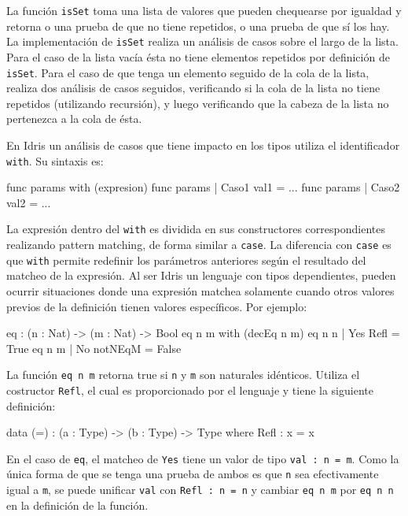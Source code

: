 La función \texttt{isSet} toma una lista de valores que pueden chequearse por igualdad y retorna o una prueba de que no tiene repetidos, o una prueba de que sí los hay. La implementación de \texttt{isSet} realiza un análisis de casos sobre el largo de la lista. Para el caso de la lista vacía ésta no tiene elementos repetidos por definición de \texttt{isSet}. Para el caso de que tenga un elemento seguido de la cola de la lista, realiza dos análisis de casos seguidos, verificando si la cola de la lista no tiene repetidos (utilizando recursión), y luego verificando que la cabeza de la lista no pertenezca a la cola de ésta.

En Idris un análisis de casos que tiene impacto en los tipos utiliza el identificador \texttt{with}. Su sintaxis es:

\begin{code}
func params with (expresion)
  func params | Caso1 val1 = ...
  func params | Caso2 val2 = ...
\end{code}

La expresión dentro del \texttt{with} es dividida en sus constructores correspondientes realizando pattern matching, de forma similar a \texttt{case}. La diferencia con \texttt{case} es que \texttt{with} permite redefinir los parámetros anteriores según el resultado del matcheo de la expresión. Al ser Idris un lenguaje con tipos dependientes, pueden ocurrir situaciones donde una expresión matchea solamente cuando otros valores previos de la definición tienen valores específicos. Por ejemplo:

\begin{code}
eq : (n : Nat) -> (m : Nat) -> Bool
eq n m with (decEq n m)
  eq n n | Yes Refl = True
  eq n m | No notNEqM = False
\end{code}

La función \texttt{eq n m} retorna true si \texttt{n} y \texttt{m} son naturales idénticos. Utiliza el costructor \texttt{Refl}, el cual es proporcionado por el lenguaje y tiene la siguiente definición:

\begin{code}
data (=) : (a : Type) -> (b : Type) -> Type where
  Refl : x = x
\end{code}

En el caso de \texttt{eq}, el matcheo de \texttt{Yes} tiene un valor de tipo \texttt{val : n = m}. Como la única forma de que se tenga una prueba de ambos es que \texttt{n} sea efectivamente igual a \texttt{m}, se puede unificar \texttt{val} con \texttt{Refl : n = n} y cambiar \texttt{eq n m} por \texttt{eq n n} en la definición de la función.

